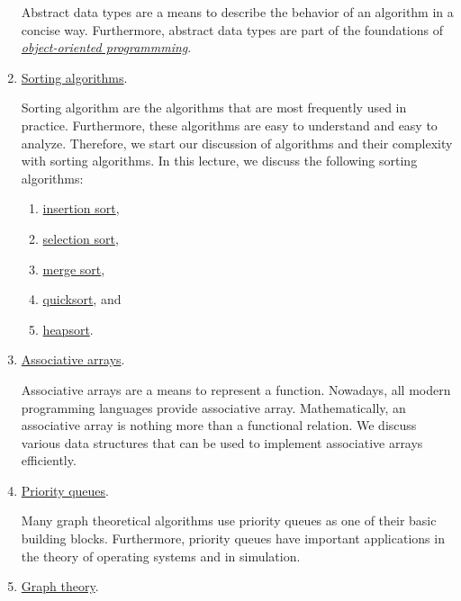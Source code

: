 \begin{enumerate}
      Abstract data types are a means to describe the behavior of an algorithm in a concise way.
      Furthermore, abstract data types are part of the foundations of 
      \href{https://en.wikipedia.org/wiki/Object-oriented_programming}{\emph{object-oriented programmming}}. 
\item \href{http://en.wikipedia.org/wiki/Sorting_algorithm}{Sorting algorithms}.

      Sorting algorithm are the algorithms that are most frequently used in practice.  Furthermore,
      these algorithms are easy to understand and easy to analyze.  Therefore, we start our
      discussion of algorithms and their complexity with sorting algorithms. 
      In this lecture, we discuss the following sorting algorithms:
      \begin{enumerate}
      \item \href{http://en.wikipedia.org/wiki/Insertion_sort}{insertion sort},
      \item \href{http://en.wikipedia.org/wiki/Selection_sort}{selection sort},
      \item \href{http://en.wikipedia.org/wiki/Merge_sort}{merge sort}, 
      \item \href{http://en.wikipedia.org/wiki/Quicksort}{quicksort}, and
      \item \href{https://en.wikipedia.org/wiki/Heapsort}{heapsort}.
      \end{enumerate}
%  

\item \href{http://en.wikipedia.org/wiki/Map_(computer_science)}{Associative arrays}.
  
      Associative arrays are a means to represent a function.  Nowadays, all modern programming
      languages provide associative array.  
      Mathematically, an associative array is nothing more than a functional relation.  
      We discuss various data structures that can be used to implement associative arrays efficiently.
\item \href{http://en.wikipedia.org/wiki/Priority_queue}{Priority queues}.
  
      Many graph theoretical algorithms use priority queues as one of their basic building blocks.
      Furthermore, priority queues have important applications in the theory of operating systems
      and in simulation.
\item \href{http://en.wikipedia.org/wiki/Graph_theory}{Graph theory}.
  

\end{enumerate}

